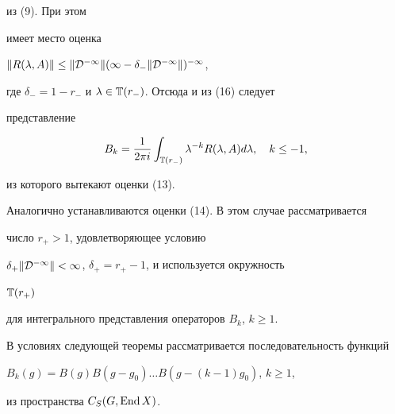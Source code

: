 \begin{pf}
из (9). При этом 


имеет место оценка 


$\|R(\lambda,A)\|\le\|\cal D^{-1}\|(1-\delta_-\|\cal D^{-1}\|)^{-1}$, 


где $\delta_-=1-r_-$ и $\lambda\in\Bbb T(r_-)$. Отсюда и из (16) следует 


представление 


$$ 


B_k=\frac{1}{2\pi i}\int_{\Bbb T(r_-)}\lambda^{-k} 


R(\lambda,A)d\lambda,\quad k\le -1, 


$$ 


из которого вытекают оценки (13). 


 


Аналогично устанавливаются оценки (14). В этом случае рассматривается 


число $r_+>1$, удовлетворяющее условию 


$\delta_+\|\cal D^{-1}\|<1$, $\delta_+=r_+-1$, и используется окружность 


$\Bbb T(r_+)$ 


для интегрального представления операторов $B_k$, $k\ge 1$. 


\end{pf} 


 


В условиях следующей теоремы рассматривается последовательность функций 


$B_k(g)=B(g)B(g-g_0)\dots B(g-(k-1)g_0)$, $k\ge 1$, 


из пространства $C_S(G,\operatorname{End} X)$. 


 


